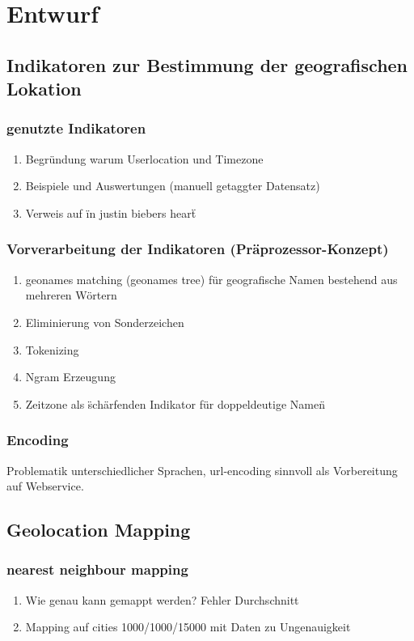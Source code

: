 \chapter{Entwurf} 

\section{Indikatoren zur Bestimmung der geografischen Lokation}

	\subsection{genutzte Indikatoren}
		\begin{enumerate}
			\item Begründung warum Userlocation und Timezone
			\item Beispiele und Auswertungen (manuell getaggter Datensatz)
			\item Verweis auf \"in justin biebers heart\"
		\end{enumerate}

	\subsection{Vorverarbeitung der Indikatoren (Präprozessor-Konzept)}
		\begin{enumerate}
			\item geonames matching (geonames tree) für geografische Namen bestehend aus mehreren Wörtern
			\item Eliminierung von Sonderzeichen
			\item Tokenizing
			\item Ngram Erzeugung
			\item {} Zeitzone als \"schärfenden Indikator für doppeldeutige Namen\"
		\end{enumerate}

	\subsection{Encoding}
		Problematik unterschiedlicher Sprachen, 
		url-encoding sinnvoll als Vorbereitung auf Webservice. 

\section{Geolocation Mapping}

	\subsection{nearest neighbour mapping}
		\begin{enumerate}
			\item {} Wie genau kann gemappt werden? Fehler Durchschnitt
			\item Mapping auf cities 1000/1000/15000 mit Daten zu Ungenauigkeit	
		\end{enumerate} 



\section{}